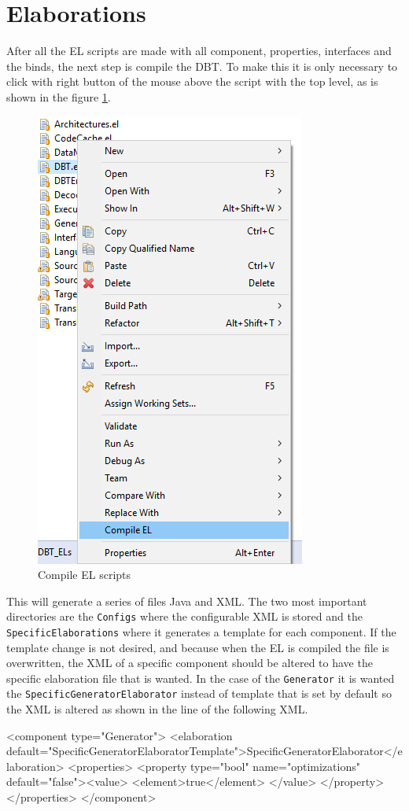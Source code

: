 \documentclass[11pt]{report}
\begin{document}
	\section{Elaborations}
	
	After all the EL scripts are made with all component, properties, interfaces and the binds, the next step is compile the DBT. To make this it is only necessary to click with right button of the mouse above the script with the top level, as is shown in the figure \ref{fig:compileel}.
	
	\begin{figure} [H]
		\centering
		\includegraphics[width=0.4\linewidth]{Images/compileEL}
		\caption{Compile EL scripts}
		\label{fig:compileel}
	\end{figure}
	
	This will generate a series of files Java and XML. The two most important directories are the \texttt{Configs} where the configurable XML is stored and the \texttt{SpecificElaborations} where it generates a template for each component. 
	If the template change is not desired, and because when the EL is compiled the file is overwritten, the XML of a specific component should be altered to have the specific elaboration file that is wanted.
	In the case of the \texttt{Generator} it is wanted the \texttt{SpecificGeneratorElaborator} instead of template that is set by default so the XML is altered as shown in the line  of the following XML.
	\begin{EL}
	<component type="Generator">
		<elaboration default="SpecificGeneratorElaboratorTemplate">SpecificGeneratorElaborator</elaboration>
			<properties>
				<property type="bool" name="optimizations" default="false"><value>
					<element>true</element>
				</value>
			</property>
		</properties>
	</component>
	\end{EL}
	
\end{document}
